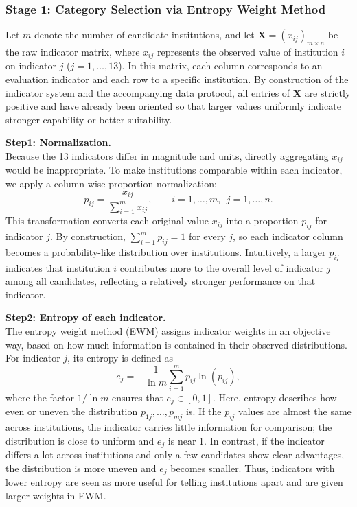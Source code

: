 \documentclass{mcmthesis}
\begin{document}
\subsubsection{Stage 1: Category Selection via Entropy Weight Method}
Let $m$ denote the number of candidate institutions, and let $\mathbf{X} = (x_{ij})_{m \times n}$ be the raw indicator matrix, where ${x_{ij}}$ represents the observed value of institution $i$ on indicator $j$ ($j = 1, \ldots, 13$). In this matrix, each column corresponds to an evaluation indicator and each row to a specific institution. By construction of the indicator system and the accompanying data protocol, all entries of $\mathbf{X}$ are strictly positive and have already been oriented so that larger values uniformly indicate stronger capability or better suitability.

\vspace{0.5\baselineskip}\textbf{Step1: Normalization.} \\
Because the 13 indicators differ in magnitude and units, directly aggregating $x_{ij}$ would be inappropriate. To make institutions comparable within each indicator, we apply a column-wise proportion normalization: \begin{equation} p_{ij} = \frac{x_{ij}}{\sum_{i=1}^{m} x_{ij}}, \qquad i = 1,\ldots,m,\ \ j = 1,\ldots,n. \end{equation} This transformation converts each original value $x_{ij}$ into a proportion $p_{ij}$ for indicator $j$. By construction, $\sum_{i=1}^{m} p_{ij} = 1$ for every $j$, so each indicator column becomes a probability-like distribution over institutions. Intuitively, a larger $p_{ij}$ indicates that institution $i$ contributes more to the overall level of indicator $j$ among all candidates, reflecting a relatively stronger performance on that indicator.

\vspace{0.5\baselineskip}
\textbf{Step2: Entropy of each indicator.}
\\ The entropy weight method (EWM) assigns indicator weights in an objective way, based on how much information is contained in their observed distributions. For indicator $j$, its entropy is defined as \begin{equation} e_j = -\frac{1}{\ln m} \sum_{i=1}^{m} p_{ij} \ln(p_{ij}), \end{equation} where the factor $1/\ln m$ ensures that $e_j \in [0,1]$. Here, entropy describes how even or uneven the distribution ${p_{1j},\ldots,p_{mj}}$ is.
If the $p_{ij}$ values are almost the same across institutions, the indicator carries little information for comparison; the distribution is close to uniform and $e_j$ is near 1. In contrast, if the indicator differs a lot across institutions and only a few candidates show clear advantages, the distribution is more uneven and $e_j$ becomes smaller. Thus, indicators with lower entropy are seen as more useful for telling institutions apart and are given larger weights in EWM.
\end{document}
